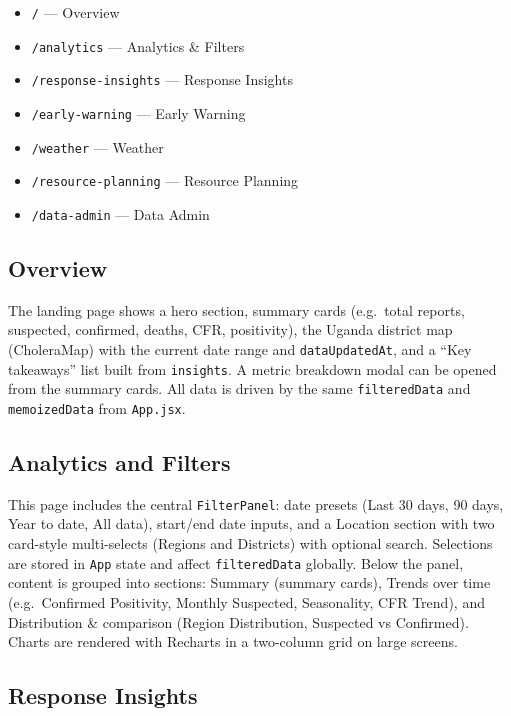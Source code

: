 \documentclass[11pt,a4paper]{article}
\begin{document}
\begin{itemize}[noitemsep]
    \item \texttt{/} --- Overview
    \item \texttt{/analytics} --- Analytics \& Filters
    \item \texttt{/response-insights} --- Response Insights
    \item \texttt{/early-warning} --- Early Warning
    \item \texttt{/weather} --- Weather
    \item \texttt{/resource-planning} --- Resource Planning
    \item \texttt{/data-admin} --- Data Admin
\end{itemize}

\subsection{Overview}

The landing page shows a hero section, summary cards (e.g.\ total reports, suspected, confirmed, deaths, CFR, positivity), the Uganda district map (CholeraMap) with the current date range and \texttt{dataUpdatedAt}, and a ``Key takeaways'' list built from \texttt{insights}. A metric breakdown modal can be opened from the summary cards. All data is driven by the same \texttt{filteredData} and \texttt{memoizedData} from \texttt{App.jsx}.

\subsection{Analytics and Filters}

This page includes the central \texttt{FilterPanel}: date presets (Last 30 days, 90 days, Year to date, All data), start/end date inputs, and a Location section with two card-style multi-selects (Regions and Districts) with optional search. Selections are stored in \texttt{App} state and affect \texttt{filteredData} globally. Below the panel, content is grouped into sections: Summary (summary cards), Trends over time (e.g.\ Confirmed Positivity, Monthly Suspected, Seasonality, CFR Trend), and Distribution \& comparison (Region Distribution, Suspected vs Confirmed). Charts are rendered with Recharts in a two-column grid on large screens.

\subsection{Response Insights}
\end{document}
